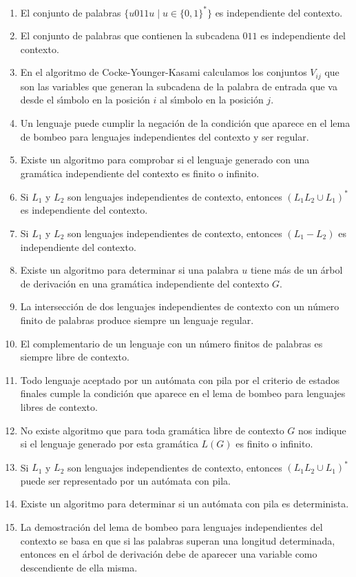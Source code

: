 \begin{enumerate}
    \item El conjunto de palabras $\{u011u\mid u\in {\{0,1\}}^{\ast}\}$ es independiente del contexto.
    \item El conjunto de palabras que contienen la subcadena $011$ es independiente del contexto.
    \item En el algoritmo de Cocke-Younger-Kasami calculamos los conjuntos $V_{ij}$ que son las variables que generan la subcadena de la palabra de entrada que va desde el sı́mbolo en la posición $i$ al sı́mbolo en la posición $j$.
    \item Un lenguaje puede cumplir la negación de la condición que aparece en el lema de bombeo para lenguajes independientes del contexto y ser regular.
    \item Existe un algoritmo para comprobar si el lenguaje generado con una gramática independiente del contexto es finito o infinito.
    \item Si $L_1$ y $L_2$ son lenguajes independientes de contexto, entonces ${(L_1L_2 \cup L_1)}^{\ast}$ es independiente del contexto.
    \item Si $L_1$ y $L_2$ son lenguajes independientes de contexto, entonces $(L_1-L_2)$ es independiente del contexto.
    \item Existe un algoritmo para determinar si una palabra $u$ tiene más de un árbol de derivación en una gramática independiente del contexto $G$.
    \item La intersección de dos lenguajes independientes de contexto con un número finito de palabras produce siempre un lenguaje regular.
    \item El complementario de un lenguaje con un número finitos de palabras es siempre libre de contexto.
    \item Todo lenguaje aceptado por un autómata con pila por el criterio de estados finales cumple la condición que aparece en el lema de bombeo para lenguajes libres de contexto.
    \item No existe algoritmo que para toda gramática libre de contexto $G$ nos indique si el lenguaje generado por esta gramática $L(G)$ es finito o infinito.
    \item Si $L_1$ y $L_2$ son lenguajes independientes de contexto, entonces ${(L_1L_2\cup L_1)}^{\ast}$ puede ser representado por un autómata con pila.
    \item Existe un algoritmo para determinar si un autómata con pila es determinista.
    \item La demostración del lema de bombeo para lenguajes independientes del contexto se basa en que si las palabras superan una longitud determinada, entonces en el árbol de derivación debe de aparecer una variable como descendiente de ella misma.

\end{enumerate}
